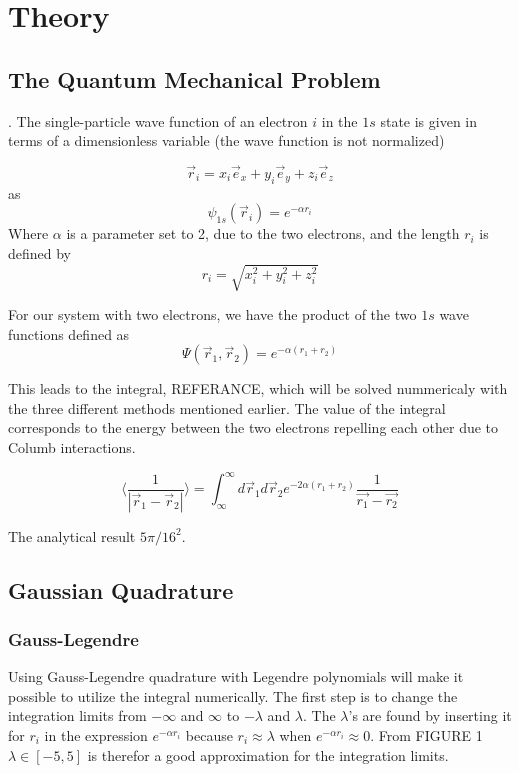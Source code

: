 \documentclass[../main.tex]{subfiles}
\begin{document}
\section{Theory} \label{sec:theory}
\subsection{The Quantum Mechanical Problem} \label{sec:QMProb}.
The single-particle wave function of an electron $i$ in the $1s$ state is given in terms of a dimensionless variable (the wave function is not normalized)

\[\vec{r}_i = x_i \vec{e}_x + y_i \vec{e}_y + z_i \vec{e}_z\]
as
\[\psi_{1s}(\vec{r}_i) = e^{-\alpha r_i}\]
Where $\alpha$ is a parameter set to 2, due to the two electrons, and the length $r_i$ is defined by
\[r_i = \sqrt{x_i^2 + y_i^2 + z_i^2}\]

For our system with two electrons, we have the product of the two $1s$ wave functions defined as
\[\Psi(\vec{r}_1, \vec{r}_2) = e^{-\alpha(r_1 + r_2)}\]

This leads to the integral, REFERANCE, which will be solved nummericaly with the three different methods mentioned earlier.
The value of the integral corresponds to the energy between the two electrons repelling each other due to Columb interactions.

\[\langle \frac{1}{|\vec{r}_1 - \vec{r}_2|} \rangle = \int_{\infty}^\infty d\vec{r}_1 d\vec{r}_2 e^{-2\alpha(r_1 + r_2)} \frac{1}{\vec{r_1} - \vec{r_2}}\]
\vspace{1cm}

The analytical result $5\pi/16^2$.

\subsection{Gaussian Quadrature} \label{sec:GQ}
\subsubsection{Gauss-Legendre}\label{sec:GLQ}
Using Gauss-Legendre quadrature with Legendre polynomials will make it possible to utilize the integral numerically. The first step is to change the integration limits from  $-\infty$ and $\infty$ to $-\lambda$ and $\lambda$. The $\lambda$'s are found by inserting it for $r_i$ in the expression $e^{-\alpha r_i}$ because $r_i \approx \lambda$ when $e^{-\alpha r_i} \approx 0$. From FIGURE 1 $\lambda \in [-5,5]$ is therefor a good approximation for the integration limits.
\end{document}
